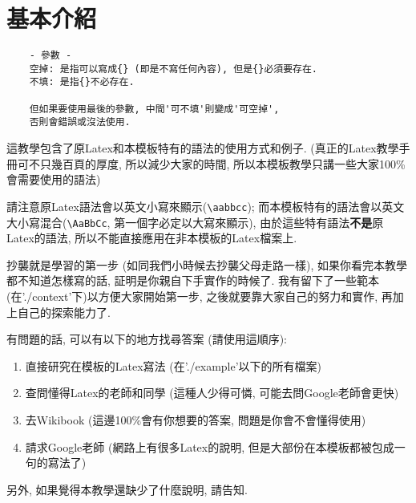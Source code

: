 \section{基本介紹}

  \begin{framed}
  \begin{verbatim}
    - 參數 -
    空掉: 是指可以寫成{} (即是不寫任何內容), 但是{}必須要存在.
    不填: 是指{}不必存在.

    但如果要使用最後的參數, 中間'可不填'則變成'可空掉',
    否則會錯誤或沒法使用.
  \end{verbatim}
  \end{framed}

這教學包含了原Latex和本模板特有的語法的使用方式和例子. (真正的Latex教學手冊可不只幾百頁的厚度, 所以減少大家的時間, 所以本模板教學只講一些大家100\%會需要使用的語法)

請注意原Latex語法會以英文小寫來顯示(\verb|\aabbcc|); 而本模板特有的語法會以英文大小寫混合(\verb|\AaBbCc|, 第一個字必定以大寫來顯示), 由於這些特有語法\textbf{不是}原Latex的語法, 所以不能直接應用在非本模板的Latex檔案上.

抄襲就是學習的第一步 (如同我們小時候去抄襲父母走路一樣), 如果你看完本教學都不知道怎樣寫的話, 証明是你親自下手實作的時候了. 我有留下了一些範本 (在'./context'下)以方便大家開始第一步, 之後就要靠大家自己的努力和實作, 再加上自己的探索能力了.

\newpage
有問題的話, 可以有以下的地方找尋答案 (請使用這順序):
\begin{enumerate}
  \item 直接研究在模板的Latex寫法 (在'./example'以下的所有檔案)
  \item 查問懂得Latex的老師和同學 (這種人少得可憐, 可能去問Google老師會更快)
  \item 去Wikibook (這邊100\%會有你想要的答案, 問題是你會不會懂得使用)
  \item 請求Google老師 (網路上有很多Latex的說明, 但是大部份在本模板都被包成一句的寫法了)
\end{enumerate}

另外, 如果覺得本教學還缺少了什麼說明, 請告知.

\EndChapter
